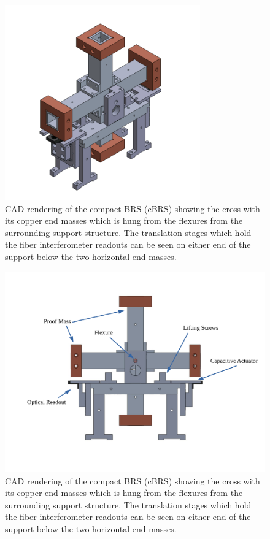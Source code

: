 \documentclass [12pt, proquest]{uwthesis}[2019]
\begin{document}
\begin{figure}[!h]
\begin{center}
\includegraphics[width=0.75\textwidth]{cBRSIso.png}
\end{center}
\caption[CAD rendering of the cBRS]{CAD rendering of the compact BRS (cBRS) showing the cross with its copper end masses which is hung from the flexures from the surrounding support structure. The translation stages which hold the fiber interferometer readouts can be seen on either end of the support below the two horizontal end masses.}
\label{cBRS1}
\end{figure}


\begin{figure}[!h]
\begin{center}
 \includegraphics[width=\textwidth]{cBRSFrontLabeled.pdf}
 
\caption[Side view of the CAD rendering of the cBRS]{CAD rendering of the compact BRS (cBRS) showing the cross with its copper end masses which is hung from the flexures from the surrounding support structure. The translation stages which hold the fiber interferometer readouts can be seen on either end of the support below the two horizontal end masses.}
\label{cBRS2}
\end{center}
\end{figure}
\end{document}
